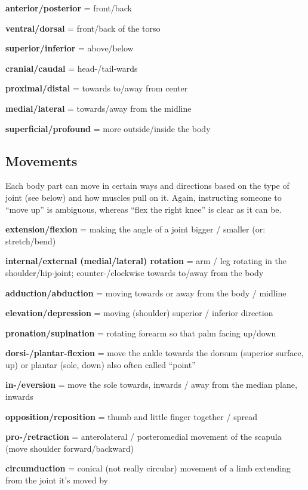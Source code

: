 \begin{itemize*}
    \item \textbf{anterior/posterior} = front/back
    \item \textbf{ventral/dorsal} = front/back of the torso
    \item \textbf{superior/inferior} = above/below
    \item \textbf{cranial/caudal} = head-/tail-wards
    \item \textbf{proximal/distal} = towards to/away from center
    \item \textbf{medial/lateral} = towards/away from the midline
    \item \textbf{superficial/profound} = more outside/inside the body
\end{itemize*}

\subsection{Movements}

Each body part can move in certain ways and directions based on the type of joint (see below) and how muscles pull on it.
Again, instructing someone to ``move up'' is ambiguous, whereas ``flex the right knee'' is clear as it can be.

\begin{itemize*}
    \item \textbf{extension/flexion} = making the angle of a joint bigger / smaller (or: stretch/bend)
    \item \textbf{internal/external (medial/lateral) rotation} = arm / leg rotating in the shoulder/hip-joint; counter-/clockwise towards to/away from the body
    \item \textbf{adduction/abduction} = moving towards or away from the body / midline
    \item \textbf{elevation/depression} = moving (shoulder) superior / inferior direction
    \item \textbf{pronation/supination} = rotating forearm so that palm facing up/down
    \item \textbf{dorsi-/plantar-flexion} = move the ankle towards the dorsum (superior surface, up) or plantar (sole, down) also often called ``point''
    \item \textbf{in-/eversion} = move the sole towards, inwards / away from the median plane, inwards
    \item \textbf{opposition/reposition} = thumb and little finger together / spread
    \item \textbf{pro-/retraction} = anterolateral / posteromedial movement of the scapula (move shoulder forward/backward)
    \item \textbf{circumduction} = conical (not really circular) movement of a limb extending from the joint it's moved by
\end{itemize*}

